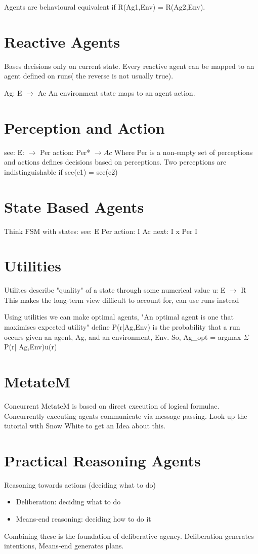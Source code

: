 \documentclass{article}
\begin{document}
Agents are behavioural equivalent if R(Ag1,Env) = R(Ag2,Env).


\section{Reactive Agents}
Bases decisions only on current state.
Every reactive agent can be mapped to an agent defined on runs( the reverse is not usually true).

Ag: E $\rightarrow$ Ac
An environment state maps to an agent action.

\section{Perception and Action}
see:  E: $\rightarrow$ Per
action:  Per* $\rightarrow Ac$
Where Per is a non-empty set of perceptions and actions defines decisions based on perceptions.
Two perceptions are indistinguishable if see(e1) = see(e2)

\section{State Based Agents}
Think FSM with states:
see: E \rightarrow Per
action: I \rightarrow Ac
next: I x Per \rightarrow I

\section{Utilities}
Utilites describe "quality" of a state through some numerical value
u: E $\rightarrow$ R
This makes the long-term view difficult to account for, can use runs instead

Using utilities we can make optimal agents,
"An optimal agent is one that maximises expected utility"
define P(r|Ag,Env) is the probability that a run occurs given an agent, Ag, and an environment, Env.
So, Ag_{opt} = argmax $\Sigma$ P(r| Ag,Env)u(r)


\section{MetateM}
Concurrent MetateM is based on direct execution of logical formulae.
Concurrently executing agents communicate via message passing.
Look up the tutorial with Snow White to get an Idea about this.

\section{Practical Reasoning Agents}
Reasoning towards actions (deciding what to do)
\begin{itemize}
    \item Deliberation: deciding what to do
    \item Means-end reasoning: deciding how to do it
\end{itemize}
Combining these is the foundation of deliberative agency.
Deliberation generates intentions, Means-end generates plans.
\end{document}
